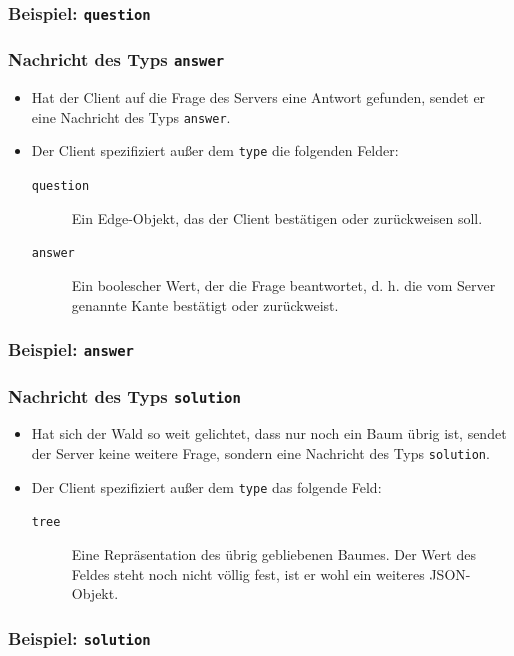 \documentclass{beamer} %
\begin{document}
\begin{frame}
    \frametitle{Beispiel: \texttt{question}}
    
\end{frame}

\begin{frame}
    \frametitle{Nachricht des Typs \texttt{answer}}
    \begin{itemize}
        \item Hat der Client auf die Frage des Servers eine Antwort gefunden, sendet er eine Nachricht des Typs \texttt{answer}.
        \item Der Client spezifiziert außer dem \texttt{type} die folgenden Felder:
            \begin{description}
                \item[\texttt{question}] Ein Edge-Objekt, das der Client bestätigen oder zurückweisen soll.
                \item[\texttt{answer}] Ein boolescher Wert, der die Frage beantwortet, d. h. die vom Server genannte Kante bestätigt oder zurückweist.
            \end{description}
    \end{itemize}
\end{frame}

\begin{frame}
    \frametitle{Beispiel: \texttt{answer}}
    
\end{frame}

\begin{frame}
    \frametitle{Nachricht des Typs \texttt{solution}}
    \begin{itemize}
        \item Hat sich der Wald so weit gelichtet, dass nur noch ein Baum übrig ist, sendet der Server keine weitere Frage, sondern eine Nachricht des Typs \texttt{solution}.
        \item Der Client spezifiziert außer dem \texttt{type} das folgende Feld:
            \begin{description}
                \item[\texttt{tree}] Eine Repräsentation des übrig gebliebenen Baumes.
                    Der Wert des Feldes steht noch nicht völlig fest, ist er wohl ein weiteres JSON-Objekt.
            \end{description}
    \end{itemize}
\end{frame}

\begin{frame}
    \frametitle{Beispiel: \texttt{solution}}
    
\end{frame}
\end{document}
